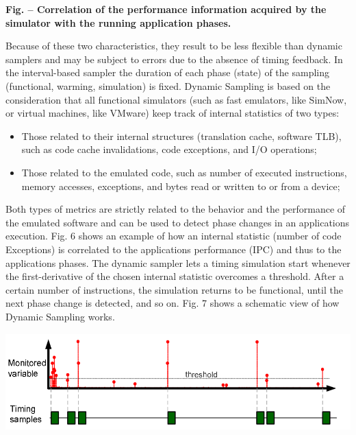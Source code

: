 \documentclass[a4paper]{article}
\newcounter{Figure}
\renewcommand\theFigure{\arabic{Figure}}
\begin{document}
{\centering{}\sffamily\bfseries
\label{bkm:Ref388170448}Fig.
\stepcounter{Figure}{\theFigure} -- Correlation of the performance
information acquired by the simulator with the running application
phases.
\par}

{
Because of these two characteristics, they result to be less flexible
than dynamic samplers and may be subject to errors due to the absence
of timing feedback. In the interval-based sampler the duration of each
phase (state) of the sampling (functional, warming, simulation) is
fixed. Dynamic Sampling is based on the consideration that all
functional simulators (such as fast emulators, like SimNow, or virtual
machines, like VMware) keep track of internal statistics of two types:}

\begin{itemize}
\item {
Those related to their internal structures (translation cache, software
TLB), such as code cache invalidations, code exceptions, and I/O
operations;}
\item {
Those related to the emulated code, such as number of executed
instructions, memory accesses, exceptions, and bytes read or written to
or from a device;}
\end{itemize}
{
Both types of metrics are strictly related to the behavior and the
performance of the emulated software and can be used to detect phase
changes in an application{\textquotesingle}s execution. Fig. 6 shows an
example of how an internal statistic (number of code Exceptions) is
correlated to the application{\textquotesingle}s performance (IPC) and
thus to the application{\textquotesingle}s phases. The dynamic sampler
lets a timing simulation start whenever the first-derivative of the
chosen internal statistic overcomes a threshold. After a certain number
of instructions, the simulation returns to be functional, until the
next phase change is detected, and so on. Fig. 7 shows a schematic view
of how Dynamic Sampling works.}

{\centering 
\includegraphics[width=5.3752in,height=1.4819in]{img7.png}
\par}
\end{document}
